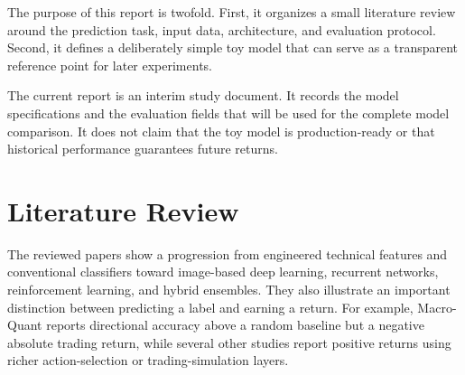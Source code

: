 The purpose of this report is twofold. First, it organizes a small literature review around the prediction task, input data, architecture, and evaluation protocol. Second, it defines a deliberately simple toy model that can serve as a transparent reference point for later experiments.

The current report is an interim study document. It records the model specifications and the evaluation fields that will be used for the complete model comparison. It does not claim that the toy model is production-ready or that historical performance guarantees future returns.

\section{Literature Review}

The reviewed papers show a progression from engineered technical features and conventional classifiers toward image-based deep learning, recurrent networks, reinforcement learning, and hybrid ensembles. They also illustrate an important distinction between predicting a label and earning a return. For example, Macro-Quant reports directional accuracy above a random baseline but a negative absolute trading return, while several other studies report positive returns using richer action-selection or trading-simulation layers.

